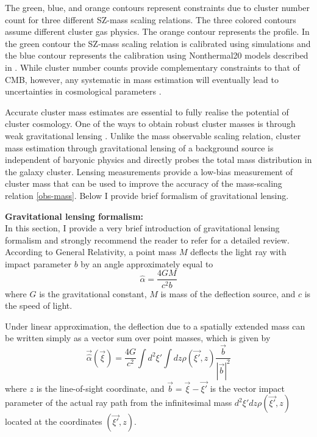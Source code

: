 The green, blue, and orange contours represent constraints due to cluster number count for three different SZ-mass scaling relations.
 The three colored contours assume different cluster gas physics. The orange contour represents the \citet{arnaud10} profile. 
 In the green contour the SZ-mass scaling relation is calibrated using \citet{bode12} simulations and the blue contour represents the calibration using Nonthermal20 models described in \citet{trac11}. %
While cluster number counts provide complementary constraints to that of CMB, however, any systematic in mass estimation will eventually lead to uncertainties in cosmological parameters \citep{hasselfield13}. 


Accurate cluster mass estimates are essential to fully realise the potential of cluster cosmology.
One of the ways to obtain robust cluster masses is through weak gravitational lensing \citep{becker10}. 
Unlike the mass observable scaling relation, cluster mass estimation through gravitational lensing of a background source is independent of baryonic physics and directly probes the total mass distribution in the galaxy cluster. 
Lensing measurements provide a low-bias measurement of cluster mass that can be used to improve the accuracy of the mass-scaling relation \ref{obs-mass}. %
Below I provide brief formalism of gravitational lensing.


\textbf{Gravitational lensing formalism:}
\\In this section, I provide a very brief introduction of gravitational lensing formalism and strongly recommend the reader to refer \citep{bartelmann01} for a detailed review.  According to General Relativity, a point mass $M$ deflects the light ray with impact parameter $b$ by an angle approximately equal to 
\begin{equation}
\hat{\alpha} = \frac{4GM}{c^{2}b}
\end{equation}
 where $G$ is the gravitational constant, $M$ is mass of the deflection source, and $c$ is the speed of light. 
  
  
Under linear approximation, the deflection due to a spatially extended mass can be written simply as a vector sum over point masses, which is given by
\begin{equation}
\vec{\hat{\alpha}}(\vec{\xi}) = \frac{4G}{c^{2}} \int d^{2}\xi' \int dz \rho(\vec{\xi'},z) \frac{\vec{b}}{|\vec{b}|^{2}}
\end{equation}
where $z$ is the line-of-sight coordinate, and $\vec{b} = \vec{\xi} - \vec{\xi'}$ is the vector impact parameter of the actual ray path from the infinitesimal mass $d^{2} \xi' dz \rho(\vec{\xi'},z)$ located at the coordinates $(\vec{\xi'},z)$.

